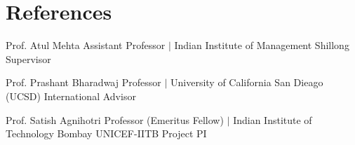 \section{References}
  \CVSubHeadingListStart
    
    \CVSubheading
      {Prof. Atul Mehta}
      {}
      {Assistant Professor $|$ Indian Institute of Management Shillong}
      {Supervisor}
      \CVItemListStart
      \CVItemListEnd

    \CVSubheading
      {Prof. Prashant Bharadwaj}
      {}
      {Professor $|$ University of California San Dieago (UCSD)}
      {International Advisor}
      \CVItemListStart
      \CVItemListEnd

    \CVSubheading
      {Prof. Satish Agnihotri}
      {}
      {Professor (Emeritus Fellow) $|$ Indian Institute of Technology Bombay}
      {UNICEF-IITB Project PI}
      \CVItemListStart
      \CVItemListEnd

      
  
    \CVSubHeadingListEnd